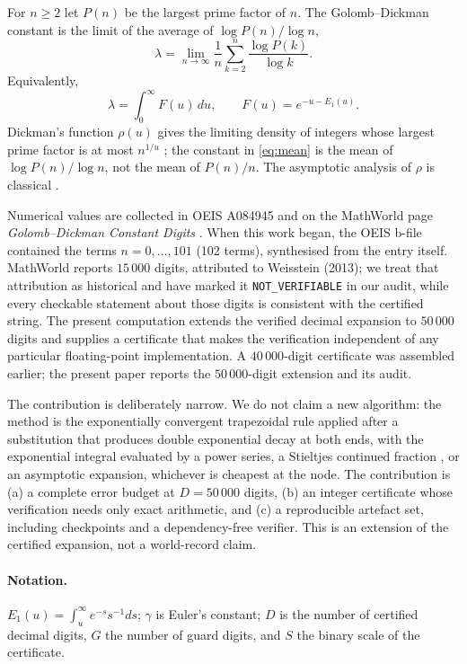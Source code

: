 \documentclass[11pt,a4paper]{article}
\theoremstyle{remark}
\newcommand{\Eone}{E_1}
\newcommand{\lam}{\lambda}
\begin{document}
For $n\ge2$ let $P(n)$ be the largest prime factor of $n$. The
Golomb--Dickman constant is the limit of the average of
$\log P(n)/\log n$,
\begin{equation}
  \lam=\lim_{n\to\infty}\frac1n\sum_{k=2}^n
       \frac{\log P(k)}{\log k}.
  \label{eq:mean}
\end{equation}
Equivalently,
\begin{equation}
  \lam=\int_0^\infty F(u)\,du,\qquad F(u)=e^{-u-\Eone(u)} .
  \label{eq:lambda}
\end{equation}
Dickman's function $\rho(u)$ gives the limiting density of integers whose
largest prime factor is at most $n^{1/u}$ \cite{dickman1930}; the constant
in \eqref{eq:mean} is the mean of $\log P(n)/\log n$, not the mean of
$P(n)/n$. The asymptotic analysis of $\rho$ is classical
\cite{debruijn1951}.

Numerical values are collected in OEIS A084945 \cite{oeisA084945} and on
the MathWorld page \emph{Golomb--Dickman Constant Digits}
\cite{mathworld}. When this work began, the OEIS b-file contained the
terms $n=0,\ldots,101$ (102 terms), synthesised from the entry itself.
MathWorld reports $15\,000$ digits, attributed to Weisstein (2013); we
treat that attribution as historical and have marked it
\texttt{NOT\_VERIFIABLE} in our audit, while every checkable statement
about those digits is consistent with the certified string. The present computation extends
the verified decimal expansion to $50\,000$ digits and supplies a
certificate that makes the verification independent of any particular
floating-point implementation. A $40\,000$-digit certificate was
assembled earlier; the present paper reports the $50\,000$-digit
extension and its audit.

The contribution is deliberately narrow. We do not claim a new
algorithm: the method is the exponentially convergent trapezoidal rule
\cite{TW2014} applied after a substitution that produces double
exponential decay at both ends, with the exponential integral evaluated
by a power series, a Stieltjes continued fraction \cite{stieltjes1894},
or an asymptotic expansion, whichever is cheapest at the node. The
contribution is (a) a complete error budget at $D=50\,000$ digits, (b) an
integer certificate whose verification needs only exact arithmetic, and
(c) a reproducible artefact set, including checkpoints and a
dependency-free verifier. This is an extension of the certified
expansion, not a world-record claim.

\paragraph{Notation.}
$\Eone(u)=\int_u^\infty e^{-s}s^{-1}ds$; $\gamma$ is Euler's constant;
$D$ is the number of certified decimal digits, $G$ the number of guard
digits, and $S$ the binary scale of the certificate.
\end{document}
